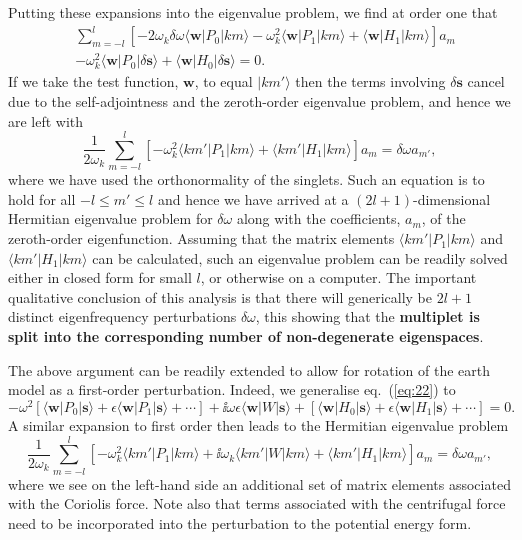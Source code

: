  Putting these expansions into the eigenvalue problem, we find at order one that
\begin{align}
&\sum_{m=-l}^{l}[-2\omega_{k}\delta\omega\langle \mathbf{w}|P_{0}|km\rangle-\omega_{k}^{2}\langle 
    \mathbf{w}|P_{1}|km\rangle+\langle \mathbf{w}|H_{1}|km\rangle]a_{m} \nonumber\\ &-\omega_{k}^{2}\langle 
        \mathbf{w}|P_{0}|\delta\mathbf{s}\rangle+\langle \mathbf{w}|H_{0}|\delta\mathbf{s}\rangle=0.\label{eq:25}
\end{align}
If we take the test function, $\mathbf{w}$, to equal $|km'\rangle$ then the terms involving $\delta\mathbf{s}$ cancel due to the self-adjointness 
 and the zeroth-order eigenvalue problem, and hence we are left with
\begin{equation}\label{eq:26}
\frac{1}{2\omega_{k}}\sum_{m=-l}^{l}[-\omega_{k}^{2}\langle km'|P_{1}|km\rangle+\langle km'|H_{1}|km\rangle]a_{m}=\delta\omega a_{m'},
\end{equation}
where we have used the orthonormality of the singlets. Such an equation is to hold for all $-l\le m'\le l$ and hence we have 
arrived at a $(2l+1)$-dimensional Hermitian eigenvalue problem for $\delta\omega$ along with the coefficients, $a_{m}$, of the 
zeroth-order eigenfunction. Assuming that the matrix elements $\langle km'|P_{1}|km\rangle$ and $\langle km'|H_{1}|km\rangle$ can 
be calculated, such an eigenvalue problem can be readily solved either in closed form for small $l$, or otherwise on a computer. 
The important qualitative conclusion of this analysis is that there will generically be $2l+1$ distinct eigenfrequency perturbations 
$\delta\omega$, this showing that the \textbf{multiplet is split into the corresponding number of non-degenerate eigenspaces}.

The above argument can be readily extended to allow for rotation of the earth model as a first-order perturbation. Indeed, we 
 generalise eq.~(\ref{eq:22}) to 
\begin{equation}\label{eq:27}
-\omega^{2}[\langle \mathbf{w}|P_{0}|\mathbf{s}\rangle+\epsilon\langle \mathbf{w}|P_{1}|\mathbf{s}\rangle+\cdots]
+\ii\omega\epsilon\langle \mathbf{w}|W|\mathbf{s}\rangle+[\langle \mathbf{w}|H_{0}|\mathbf{s}\rangle+\epsilon\langle \mathbf{w}|H_{1}|\mathbf{s}\rangle+\cdots]=0.
\end{equation}
A similar expansion to first order then leads to the Hermitian eigenvalue problem
\begin{equation}\label{eq:28}
\frac{1}{2\omega_{k}}\sum_{m=-l}^{l}[-\omega_{k}^{2}\langle km'|P_{1}|km\rangle+\ii\omega_{k}\langle km'|W|km\rangle+\langle km'|H_{1}|km\rangle]a_{m}=\delta\omega a_{m'},
\end{equation}
where we see on the left-hand side an additional set of matrix elements associated with the Coriolis force. Note 
also that terms associated with the centrifugal force need to be incorporated into the perturbation to the potential energy form.

